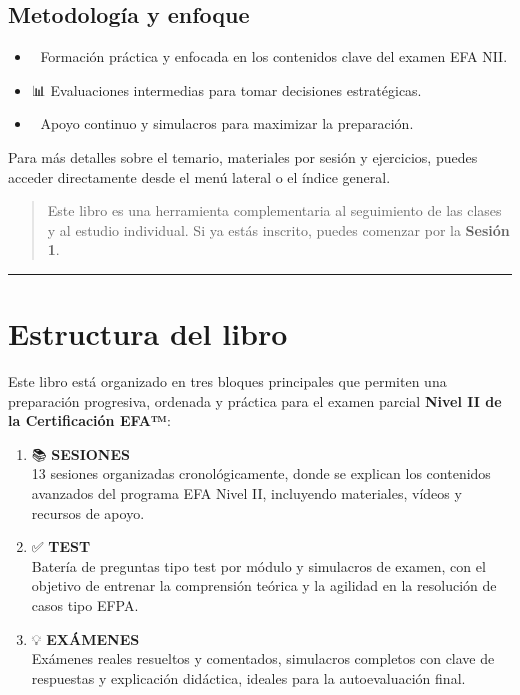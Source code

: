 \documentclass[
  letterpaper,
  DIV=11,
  numbers=noendperiod]{scrreprt}
\providecommand{\tightlist}{%
  \setlength{\itemsep}{0pt}\setlength{\parskip}{0pt}}\usepackage{longtable,booktabs,array}
\begin{document}
\subsection{Metodología y enfoque}\label{metodologuxeda-y-enfoque}

\begin{itemize}
\tightlist
\item
  🎯 Formación práctica y enfocada en los contenidos clave del examen
  EFA NII.
\item
  📊 Evaluaciones intermedias para tomar decisiones estratégicas.
\item
  🧠 Apoyo continuo y simulacros para maximizar la preparación.
\end{itemize}

Para más detalles sobre el temario, materiales por sesión y ejercicios,
puedes acceder directamente desde el menú lateral o el índice general.

\begin{quote}
Este libro es una herramienta complementaria al seguimiento de las
clases y al estudio individual. Si ya estás inscrito, puedes comenzar
por la \textbf{Sesión 1}.
\end{quote}

\begin{center}\rule{0.5\linewidth}{0.5pt}\end{center}

\section{Estructura del libro}\label{estructura-del-libro}

Este libro está organizado en tres bloques principales que permiten una
preparación progresiva, ordenada y práctica para el examen parcial
\textbf{Nivel II de la Certificación EFA™}:

\begin{enumerate}
\def\labelenumi{\arabic{enumi}.}
\item
  📚 \textbf{SESIONES}\\
  13 sesiones organizadas cronológicamente, donde se explican los
  contenidos avanzados del programa EFA Nivel II, incluyendo materiales,
  vídeos y recursos de apoyo.
\item
  ✅ \textbf{TEST}\\
  Batería de preguntas tipo test por módulo y simulacros de examen, con
  el objetivo de entrenar la comprensión teórica y la agilidad en la
  resolución de casos tipo EFPA.
\item
  💡 \textbf{EXÁMENES}\\
  Exámenes reales resueltos y comentados, simulacros completos con clave
  de respuestas y explicación didáctica, ideales para la autoevaluación
  final.
\end{enumerate}
\end{document}
